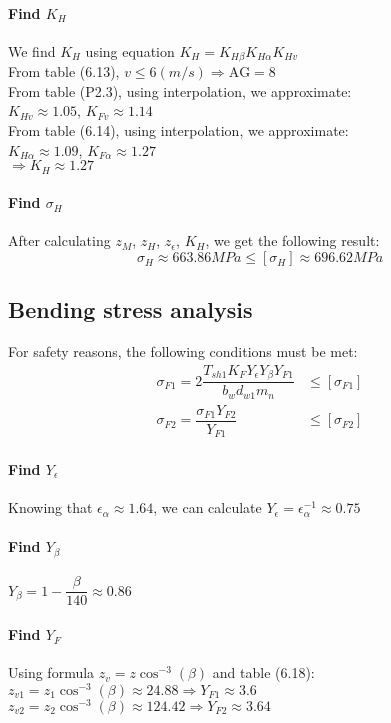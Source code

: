 \paragraph{Find $ K_H $} We find $ K_H $ using equation $ K_H = K_{H\beta}K_{H\alpha}K_{Hv} $\\
From table (6.13), $ v\leq 6 \unit{(m/s)}\Rightarrow \text{AG} = 8 $ \\
From table (P2.3), using interpolation, we approximate:\\ $ K_{Hv} \approx1.05$, $ K_{Fv} \approx1.14$\\
From table (6.14), using interpolation, we approximate:\\ $ K_{H\alpha} \approx1.09$, $ K_{F\alpha} \approx1.27 $ \\	
$ \Rightarrow K_H \approx 1.27 $
\paragraph{Find $ \sigma_H $} After calculating $ z_M $, $ z_H $, $ z_\epsilon $, $ K_H $, we get the following result:
	\[\sigma_H \approx 663.86\unit{MPa}\leq [\sigma_H] \approx 696.62\unit{MPa}\] 

\subsection{Bending stress analysis}
For safety reasons, the following conditions must be met:
\begin{align}
	\sigma_{F1} = 2\dfrac{T_{sh1}K_FY_\epsilon Y_\beta Y_{F1}}{b_wd_{w1}m_n} & \leq [\sigma_{F1}] \label{scond1}\\
	\sigma_{F2} = \dfrac{\sigma_{F1}Y_{F2}}{Y_{F1}} & \leq [\sigma_{F2}] \label{scond2}
\end{align}
\paragraph{Find $ Y_\epsilon $} Knowing that $ \epsilon_\alpha \approx 1.64 $, we can calculate $ Y_\epsilon = \epsilon_\alpha^{-1} \approx 0.75 $
\paragraph{Find $ Y_\beta $} $ Y_\beta = 1-\dfrac{\beta}{140}\approx0.86$
\paragraph{Find $ Y_F $} Using formula $ z_v = z\cos^{-3}(\beta) $ and table (6.18):\\
$ z_{v1} = z_1\cos^{-3}(\beta) \approx 24.88 \Rightarrow Y_{F1} \approx 3.6$\\
$ z_{v2} = z_2\cos^{-3}(\beta) \approx 124.42 \Rightarrow Y_{F2} \approx 3.64 $

